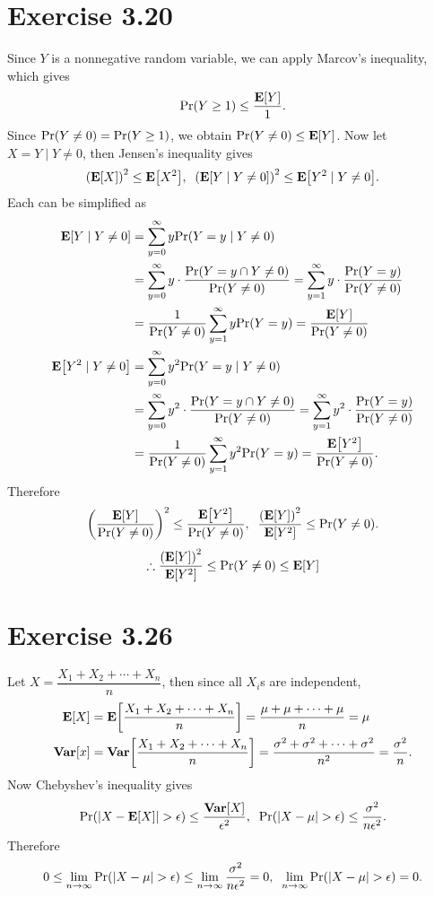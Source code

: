 \documentclass{article}
\begin{document}
\section*{Exercise 3.20}
Since $Y$ is a nonnegative random variable, we can apply Marcov's inequality, which gives
$$\mathrm{Pr}\qty(Y \geq 1) \leq \frac{\mathbf{E}\qty[Y]}{1}.$$
Since $\mathrm{Pr}\qty(Y \neq 0) = \mathrm{Pr}\qty(Y \geq 1)$, we obtain $\mathrm{Pr}\qty(Y \neq 0) \leq {\mathbf{E}\qty[Y]}$.
Now let $X = Y \;|\; Y \neq 0$, then Jensen's inequality gives
$$\qty(\mathbf{E}\qty[X])^2 \leq \mathbf{E}\qty[X^2], \;\; \qty(\mathbf{E}\qty[Y \;|\; Y \neq 0])^2 \leq \mathbf{E}\qty[Y^2 \;|\; Y \neq 0].$$
Each can be simplified as
\begin{align*}
  \mathbf{E}\qty[Y \;|\; Y \neq 0] &= \sum_{y=0}^{\infty}y\mathrm{Pr}\qty(Y=y \;|\; Y \neq 0) \\
  &= \sum_{y=0}^{\infty}y\cdot\frac{\mathrm{Pr}\qty(Y=y \cap Y \neq 0)}{\mathrm{Pr}\qty(Y \neq 0)} = \sum_{y=1}^{\infty}y\cdot\frac{\mathrm{Pr}\qty(Y=y)}{\mathrm{Pr}\qty(Y \neq 0)} \\
  &= \frac{1}{\mathrm{Pr}\qty(Y \neq 0)}\sum_{y=1}^{\infty}y\mathrm{Pr}\qty(Y=y) = \frac{\mathbf{E}\qty[Y]}{\mathrm{Pr}\qty(Y \neq 0)} \\
  \mathbf{E}\qty[Y^2 \;|\; Y \neq 0] &= \sum_{y=0}^{\infty}y^2\mathrm{Pr}\qty(Y=y \;|\; Y \neq 0) \\
  &= \sum_{y=0}^{\infty}y^2\cdot\frac{\mathrm{Pr}\qty(Y=y \cap Y \neq 0)}{\mathrm{Pr}\qty(Y \neq 0)} = \sum_{y=1}^{\infty}y^2\cdot\frac{\mathrm{Pr}\qty(Y=y)}{\mathrm{Pr}\qty(Y \neq 0)} \\
  &= \frac{1}{\mathrm{Pr}\qty(Y \neq 0)}\sum_{y=1}^{\infty}y^2\mathrm{Pr}\qty(Y=y) = \frac{\mathbf{E}\qty[Y^2]}{\mathrm{Pr}\qty(Y \neq 0)}.
\end{align*}
Therefore
$$\qty(\frac{\mathbf{E}\qty[Y]}{\mathrm{Pr}\qty(Y \neq 0)})^2 \leq \frac{\mathbf{E}\qty[Y^2]}{\mathrm{Pr}\qty(Y \neq 0)}, \;\; \frac{\qty(\mathbf{E}\qty[Y])^2}{\mathbf{E}\qty[Y^2]} \leq \mathrm{Pr}\qty(Y \neq 0).$$
$$\therefore \frac{\qty(\mathbf{E}\qty[Y])^2}{\mathbf{E}\qty[Y^2]} \leq \mathrm{Pr}\qty(Y \neq 0) \leq \mathbf{E}\qty[Y]$$

\section*{Exercise 3.26}
Let $X = \dfrac{X_1 + X_2 + \cdots + X_n}{n}$, then since all $X_i$s are independent, 
\begin{align*}
  \mathbf{E}\qty[X] &= \mathbf{E}\qty[\dfrac{X_1 + X_2 + \cdots + X_n}{n}] = \frac{\mu + \mu + \cdots + \mu}{n} = \mu \\
  \mathbf{Var}\qty[x]&= \mathbf{Var}\qty[\dfrac{X_1 + X_2 + \cdots + X_n}{n}] = \frac{\sigma^2 + \sigma^2 + \cdots + \sigma^2}{n^2} = \frac{\sigma^2}{n}.
\end{align*}
Now Chebyshev’s inequality gives
$$\mathrm{Pr}\qty(\qty|X - \mathbf{E}\qty[X]| > \epsilon) \leq \frac{\mathbf{Var}\qty[X]}{\epsilon^2}, \;\; \mathrm{Pr}\qty(\qty|X - \mu| > \epsilon) \leq \frac{\sigma^2}{n\epsilon^2}.$$
Therefore
$$0 \leq \lim_{n \to \infty}\mathrm{Pr}\qty(\qty|X - \mu| > \epsilon) \leq \lim_{n \to \infty}\frac{\sigma^2}{n\epsilon^2} = 0, \;\; \lim_{n \to \infty}\mathrm{Pr}\qty(\qty|X - \mu| > \epsilon) = 0.$$
\end{document}
